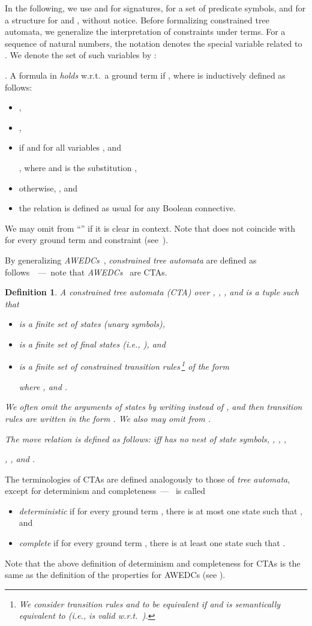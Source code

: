 \documentclass[copyright,creativecommons]{eptcs}
\newtheorem{definition}{Definition}
\begin{document}
In the following, we use  and  for signatures,  for a set of
 predicate symbols, and    for a structure
 for  and , without notice. 
Before formalizing constrained tree automata, 
we generalize the interpretation of constraints under terms.
For a sequence  of natural numbers, the notation  denotes
the special variable related to .
We denote the set of such variables by :
  
 .
A formula  in  \emph{holds}
 w.r.t.\ a ground term    if , where  is inductively defined as follows: 
 \begin{itemize}
  \item ,
  \item ,
  \item  if  
	 and    for all variables
	  , and
	 
	, where    and  is the
	substitution ,
  \item otherwise, , and
  \item the relation  is defined as usual for any Boolean
	connective. \end{itemize}
We may omit  from ``'' if it is clear in context.
Note that    does not coincide with 
  for every ground term  and constraint 
(see~\cite{CTA}).


By generalizing \emph{AWEDCs}~\cite{TATA}, \emph{constrained tree
automata} are defined as follows~\cite{CTA}~---~note that
\emph{AWEDCs}~\cite{TATA} are CTAs.
\begin{definition}A \emph{constrained tree automata} (CTA) over ,
 , , and  is a tuple    such that
\begin{itemize}
  \item  is a finite set of \emph{states} (unary symbols), 
  \item  is a finite set of \emph{final} states (i.e., 
	 ), and 
  \item  is a finite set of \emph{constrained transition
	rules}\,\footnote{ We consider transition rules  and
  to be equivalent if  
  and  is semantically equivalent to  (i.e.,
  is valid w.r.t.\ ).}
 of the form
 
   where   
 ,    and  
 .  
 \end{itemize}
 We often omit the arguments of states by writing  instead of
 , and then transition rules are written in the form
 . 
 We also may omit  from . 

The \emph{move relation}  is defined as follows:
   iff  has no nest of state symbols,  
  ,   ,
   ,  
 
 , , 
and   .
\end{definition}
The terminologies of CTAs are defined analogously to those of \emph{tree
 automata}, except for determinism and completeness~---~ is called
 \begin{itemize}
  \item \emph{deterministic} if for every ground term
       , there is at most one state    such that 
        , and
  \item \emph{complete} if for every ground term ,
	there is at least one state    such that 
	 .
 \end{itemize}
Note that the above definition of determinism and completeness for CTAs
is the same as the definition of the properties for AWEDCs (see
\cite{TATA}). 
\end{document}
